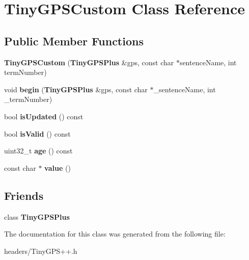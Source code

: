 \section{Tiny\+G\+P\+S\+Custom Class Reference}
\label{class_tiny_g_p_s_custom}
\subsection*{Public Member Functions}
\begin{DoxyCompactItemize}
\item 
{\bfseries Tiny\+G\+P\+S\+Custom} ({\bf Tiny\+G\+P\+S\+Plus} \&gps, const char $\ast$sentence\+Name, int term\+Number)\label{class_tiny_g_p_s_custom_a29b2a658bf95d8e6265e983b1c0251b5}

\item 
void {\bfseries begin} ({\bf Tiny\+G\+P\+S\+Plus} \&gps, const char $\ast$\+\_\+sentence\+Name, int \+\_\+term\+Number)\label{class_tiny_g_p_s_custom_a3bf972f7e2e7e3f483071630e5ca8355}

\item 
bool {\bfseries is\+Updated} () const \label{class_tiny_g_p_s_custom_a3905509b3f88d67e248855c135744b14}

\item 
bool {\bfseries is\+Valid} () const \label{class_tiny_g_p_s_custom_a06fad8448c014424bf96ed379b55da21}

\item 
uint32\+\_\+t {\bfseries age} () const \label{class_tiny_g_p_s_custom_a9bacaf774b1dba9ad942435d3ed1c2cc}

\item 
const char $\ast$ {\bfseries value} ()\label{class_tiny_g_p_s_custom_ac5ad40a3d9b6fe386b2309f972566674}

\end{DoxyCompactItemize}
\subsection*{Friends}
\begin{DoxyCompactItemize}
\item 
class {\bfseries Tiny\+G\+P\+S\+Plus}\label{class_tiny_g_p_s_custom_a6501fd5ef19ae166d43e0e5781609ee2}

\end{DoxyCompactItemize}


The documentation for this class was generated from the following file\+:\begin{DoxyCompactItemize}
\item 
headers/Tiny\+G\+P\+S++.\+h\end{DoxyCompactItemize}
